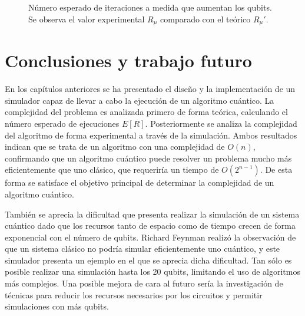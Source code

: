 %
\begin{figure}[!htb]
\centering
{}
\caption{Número esperado de iteraciones a medida que aumentan los qubits. Se 
observa el valor experimental $R_\mu$ comparado con el teórico $R_\mu'$.}
\label{fig:comp-qc}
\end{figure}
%


%


\chapter{Conclusiones y trabajo futuro}

En los capítulos anteriores se ha presentado el diseño y la implementación de un 
simulador capaz de llevar a cabo la ejecución de un algoritmo cuántico.  La 
complejidad del problema es analizada primero de forma teórica, calculando el 
número esperado de ejecuciones $E[R]$. Posteriormente se analiza la complejidad 
del algoritmo de forma experimental a través de la simulación.
Ambos resultados indican que se trata de un algoritmo con una complejidad de 
$O(n)$, confirmando que un algoritmo cuántico puede resolver un problema mucho 
más eficientemente que uno clásico, que requeriría un tiempo de $O(2^{n-1})$. De 
esta forma se satisface el objetivo principal de determinar la complejidad de un 
algoritmo cuántico.

También se aprecia la dificultad que presenta realizar la simulación de un 
sistema cuántico dado que los recursos tanto de espacio como de tiempo crecen de 
forma exponencial con el número de qubits. Richard Feynman realizó la 
observación de que un sistema clásico no podría simular eficientemente uno 
cuántico, y este simulador presenta un ejemplo en el que se aprecia dicha 
dificultad. Tan sólo es posible realizar una simulación hasta los 20 qubits, 
limitando el uso de algoritmos más complejos. Una posible mejora de cara al 
futuro sería la investigación de técnicas para reducir los recursos necesarios 
por los circuitos y permitir simulaciones con más qubits.

